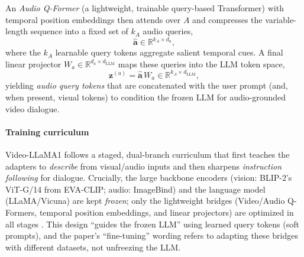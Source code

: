 \begin{enrichment}
\begin{enrichment}
        An \emph{Audio Q-Former} (a lightweight, trainable query-based Transformer) with temporal position embeddings then attends over $A$ and compresses the variable-length sequence into a fixed set of $k_A$ audio queries,
        \[
        \hat{\mathbf{a}}\in\mathbb{R}^{k_A\times d_a},
        \]
        where the $k_A$ learnable query tokens aggregate salient temporal cues. A final linear projector $W_a\in\mathbb{R}^{d_a\times d_{\text{LLM}}}$ maps these queries into the LLM token space,
        \[
        \mathbf{z}^{(a)}=\hat{\mathbf{a}}\,W_a \in \mathbb{R}^{k_A \times d_{\text{LLM}}},
        \]
        yielding \emph{audio query tokens} that are concatenated with the user prompt (and, when present, visual tokens) to condition the frozen LLM for audio-grounded video dialogue.
        
        \paragraph{Training curriculum}
        Video-LLaMA1 follows a staged, dual-branch curriculum that first teaches the adapters to \emph{describe} from visual/audio inputs and then sharpens \emph{instruction following} for dialogue. Crucially, the large backbone encoders (vision: BLIP\mbox{-}2’s ViT\mbox{-}G/14 from EVA\mbox{-}CLIP; audio: ImageBind) and the language model (LLaMA/Vicuna) are kept \emph{frozen}; only the lightweight bridges (Video/Audio Q\mbox{-}Formers, temporal position embeddings, and linear projectors) are optimized in all stages \cite{zhang2023_videollama}. This design “guides the frozen LLM” using learned query tokens (soft prompts), and the paper’s “fine\mbox{-}tuning” wording refers to adapting these bridges with different datasets, not unfreezing the LLM.
        
        \newpage
        

\end{enrichment}
\end{enrichment}

